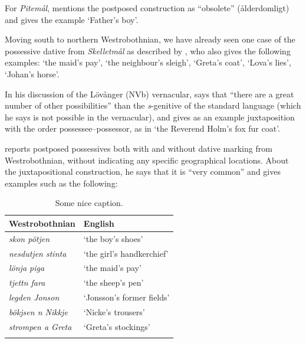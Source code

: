 For \textit{Pitemål}, \citet[11]{Brännström1993} mentions the postposed construction as “obsolete” (ålderdomligt) and gives the example  ‘Father’s boy’. 

Moving south to northern Westrobothnian, we have already seen one case of the possessive dative from \textit{Skelletmål} as described by \citet[22]{Marklund1976}, who also gives the following examples:  ‘the maid’s pay’,  ‘the neighbour’s sleigh’,  ‘Greta’s coat’,  ‘Lova’s lies’, ‘Johan’s horse’. 

In his discussion of the Lövånger (NVb) vernacular, \citet[208]{Holm1942} says that “there are a great number of other possibilities” than the \textit{s}{}-genitive of the standard language (which he says is not possible in the vernacular), and gives as an example juxtaposition with the order possessee–possessor, as in  ‘the Reverend Holm’s fox fur coat’. 

\citet[125]{Larsson1929} reports postposed possessives both with and without dative marking from Westrobothnian, without indicating any specific geographical locations. About the juxtapositional construction, he says that it is “very common” and gives examples such as the following:

\begin{table}
\begin{tabular}{ll}
\lsptoprule Westrobothnian & English \\
\midrule 
\textit{skon pötjen} & ‘the boy’s shoes’\\ 
\textit{nesdutjen stinta} & ‘the girl’s handkerchief’\\ 
\textit{lönja piga} & ‘the maid’s pay’\\ 
\textit{tjettn fara} & ‘the sheep’s pen’\\ 
\textit{legden Jonson} & ‘Jonsson’s former fields’\\ 
\textit{bökjsen n Nikkje} & ‘Nicke’s trousers’\\ 
\textit{strompen a Greta} & ‘Greta’s stockings’\\
\lspbottomrule
\end{tabular}
\caption{Some nice caption.}
\label{tab:5.1}
\end{table} 

